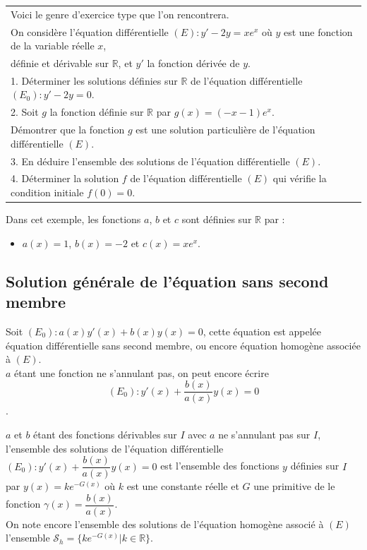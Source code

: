 \documentclass[french]{book}
\newcommand{\R}{\mathbb {R}}
\newcommand{\cals}{\mathscr{S}}
\begin{document}
\begin{tabular}{||l}
Voici le genre d'exercice type que l'on rencontrera. \\

On considère l'équation différentielle $(E):y'-2y=xe^x$ où $y$ est une fonction de la variable réelle $x$, \\
définie et dérivable sur $\R$, et $y'$ la fonction dérivée de $y$. \\
1. Déterminer les solutions définies sur $\R$ de l'équation différentielle $(E_0):y'-2y=0$. \\
2. Soit $g$ la fonction définie sur $\R$ par $g(x)=(-x-1)e^x$. \\
\hspace*{0.3cm} Démontrer que la fonction $g$ est une solution particulière de l'équation différentielle $(E)$. \\
3. En déduire l'ensemble des solutions de l'équation différentielle $(E)$. \\
4. Déterminer la solution $f$ de l'équation différentielle $(E)$ qui vérifie la condition initiale $f(0)=0$. \\
\end{tabular}



\begin{exemple}
Dans cet exemple, les fonctions $a$, $b$ et $c$ sont définies sur $\R$ par :
\begin{itemize}
   \item $a(x)=1$, $b(x)=-2$ et $c(x)=xe^x$.
\end{itemize}
\end{exemple}


\newpage

\subsection{Solution générale de l'équation sans second membre}

Soit $(E_0):a(x)y'(x)+b(x)y(x)=0$, cette équation est appelée équation différentielle sans second membre, ou encore équation homogène associée à $(E)$. \\
$a$ étant une fonction ne s'annulant pas, on peut encore écrire 
$$(E_0):y'(x)+\dfrac{b(x)}{a(x)}y(x)=0$$.

\begin{thm}
   $a$ et $b$ étant des fonctions dérivables sur $I$ avec $a$ ne s'annulant pas sur $I$, l'ensemble des solutions de l'équation différentielle $(E_0):y'(x)+\dfrac{b(x)}{a(x)}y(x)=0$ est l'ensemble des fonctions $y$ définies sur $I$ par $y(x)=ke^{-G(x)}$ où $k$ est une constante réelle et $G$ une primitive de le fonction $\gamma(x)=\dfrac{b(x)}{a(x)}$. \\ 
   
 On note encore  l'ensemble des solutions de l'équation homogène associé à $(E)$ l'ensemble $\cals_h=\{  ke^{-G(x)} \vert k\in \mathbb{R} \}$.
  
\end{thm}
\end{document}

